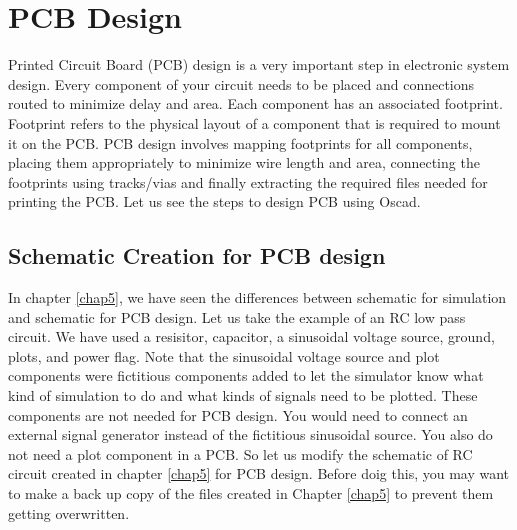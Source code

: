 \chapter{PCB Design}
\label{chap7}
Printed Circuit Board (PCB)  design is a very important step in electronic system design. Every component of your circuit needs to be placed and connections routed to minimize delay and area. Each component has an associated footprint. Footprint refers to the physical layout of a component that is required to mount it on the PCB.  PCB design involves mapping footprints for all components, placing them appropriately to minimize wire length and area, connecting the footprints using tracks/vias and finally extracting the required files needed for printing the PCB. Let us see the steps to design PCB using Oscad.
\section{Schematic Creation for PCB design}
In chapter \ref{chap5}, we have seen the differences between schematic for simulation and schematic for PCB design. Let us take the example of an RC low pass circuit. We have used a resisitor, capacitor, a sinusoidal voltage source, ground, plots, and power flag. Note that the sinusoidal voltage source and plot components were fictitious components added to let the simulator know what kind of simulation to do and what kinds of signals need to be plotted. These components are not needed for PCB design. You would need to connect an external signal generator instead of the fictitious sinusoidal source. You also do not need a plot component in a PCB. So let us modify the schematic of RC circuit created in chapter \ref{chap5} for PCB design. Before doig this, you may want to make a back up copy of the files created in Chapter \ref{chap5} to prevent them getting overwritten.

